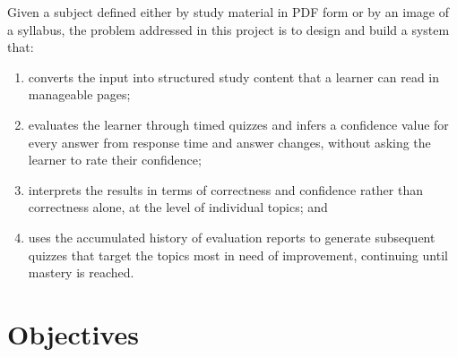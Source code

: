 \documentclass[12pt,a4paper,oneside]{report}
\begin{document}
Given a subject defined either by study material in PDF form or by an image
of a syllabus, the problem addressed in this project is to design and
build a system that:
\begin{enumerate}[label=(\roman*)]
  \item converts the input into structured study content that a learner can
        read in manageable pages;
  \item evaluates the learner through timed quizzes and infers a confidence
        value for every answer from response time and answer changes,
        without asking the learner to rate their confidence;
  \item interprets the results in terms of correctness and confidence rather
        than correctness alone, at the level of individual topics; and
  \item uses the accumulated history of evaluation reports to generate
        subsequent quizzes that target the topics most in need of
        improvement, continuing until mastery is reached.
\end{enumerate}

\section{Objectives}
\end{document}
